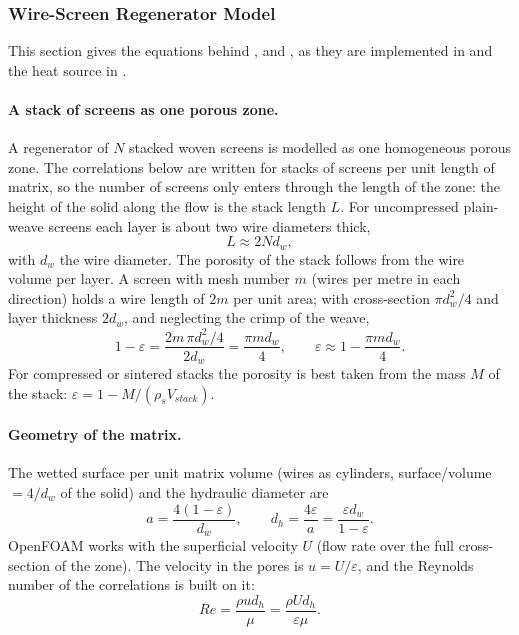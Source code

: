 \subsubsection{Wire-Screen Regenerator Model}\label{sec:regenModel}
This section gives the equations behind ,  and , as they are implemented in  and the heat source in .

\paragraph{A stack of screens as one porous zone.}
A regenerator of $N$ stacked woven screens is modelled as one homogeneous porous zone. The correlations below are written for stacks of screens per unit length of matrix, so the number of screens only enters through the length of the zone: the height of the  solid along the flow is the stack length $L$. For uncompressed plain-weave screens each layer is about two wire diameters thick,
\begin{equation}
L \approx 2 N d_w ,
\end{equation}
with $d_w$ the wire diameter. The porosity of the stack follows from the wire volume per layer. A screen with mesh number $m$ (wires per metre in each direction) holds a wire length of $2m$ per unit area; with cross-section $\pi d_w^2/4$ and layer thickness $2 d_w$, and neglecting the crimp of the weave,
\begin{equation}
1 - \varepsilon = \frac{2m \, \pi d_w^2/4}{2 d_w} = \frac{\pi m d_w}{4},
\qquad \varepsilon \approx 1 - \frac{\pi m d_w}{4} .
\end{equation}
For compressed or sintered stacks the porosity is best taken from the mass $M$ of the stack: $\varepsilon = 1 - M/(\rho_s V_{stack})$.

\paragraph{Geometry of the matrix.}
The wetted surface per unit matrix volume (wires as cylinders, surface/volume $= 4/d_w$ of the solid) and the hydraulic diameter are
\begin{equation}
a = \frac{4(1-\varepsilon)}{d_w}, \qquad d_h = \frac{4\varepsilon}{a} = \frac{\varepsilon d_w}{1-\varepsilon} .
\end{equation}
OpenFOAM works with the superficial velocity $U$ (flow rate over the full cross-section of the zone). The velocity in the pores is $u = U/\varepsilon$, and the Reynolds number of the correlations is built on it:
\begin{equation}
Re = \frac{\rho u d_h}{\mu} = \frac{\rho U d_h}{\varepsilon \mu} .
\end{equation}


